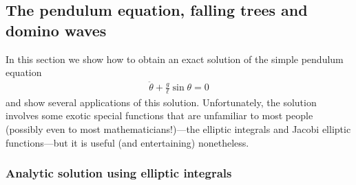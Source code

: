 \documentclass[12pt]{amsart}
\newcommand{\eqst}[1]{\begin{align*}#1\end{align*}}
\begin{document}
\subsection{The pendulum equation, falling trees and domino waves}

In this section we show how to obtain an exact solution of the simple pendulum equation
\eqst{
\ddot{\theta} + \frac{g}{\ell} \sin \theta = 0
}
and show several applications of this solution. Unfortunately, the solution involves some exotic special functions that are unfamiliar to most people (possibly even to most mathematicians!)---the elliptic integrals and Jacobi elliptic functions---but it is useful (and entertaining) nonetheless.

\subsubsection{Analytic solution using elliptic integrals}
\end{document}
